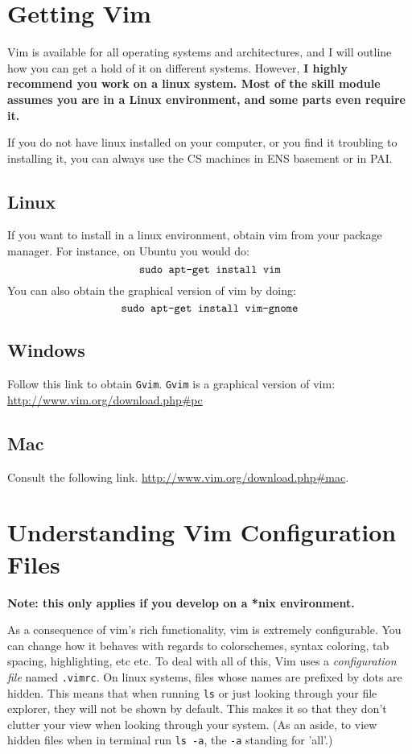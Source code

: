 \section{Getting Vim}
Vim is available for all operating systems and architectures, and I will
outline how you can get a hold of it on different systems. However, 
{\bf I highly recommend you work on a linux system. Most of the skill module 
assumes you are in a Linux environment, and some parts even require it.}

If you do not have linux installed on your computer, or you find it troubling
to installing it, you can always use the CS machines in ENS basement or 
in PAI.

\subsection{Linux}
If you want to install in a linux environment, obtain vim from your package 
manager. For instance, on Ubuntu you would do:
$$\text{\texttt{sudo apt-get install vim}}$$
You can also obtain the graphical version of vim by doing:
$$\text{\texttt{sudo apt-get install vim-gnome}}$$

\subsection{Windows}
Follow this link to obtain \texttt{Gvim}. \texttt{Gvim} is a graphical
version of vim:
\url{http://www.vim.org/download.php#pc}

\subsection{Mac}
Consult the following link. \url{http://www.vim.org/download.php#mac}.

\section{Understanding Vim Configuration Files}
{\bf Note: this only applies if you develop on a *nix environment.}

As a consequence of vim's rich functionality, vim is 
extremely configurable. You can change how it behaves with regards to 
colorschemes, syntax coloring, tab spacing, highlighting, etc etc. 
To deal with all of this, Vim uses a \emph{configuration file} named 
\texttt{.vimrc}. On linux systems, files whose names are prefixed by dots 
are hidden. This means that when running \texttt{ls}
or just looking through your file explorer, they will not be shown by default.
This makes it so that they don't clutter your view when looking through your
system. (As an aside, to view hidden files when in terminal run
\texttt{ls -a}, the \texttt{-a} standing for 'all'.)

